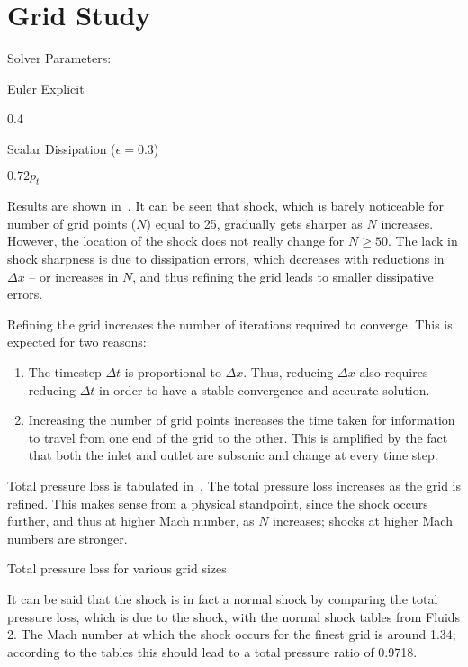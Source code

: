 \section{Grid Study}
Solver Parameters:
\begin{description}[noitemsep]
    \item[Timestepping Scheme:] Euler Explicit
    \item[CFL:] 0.4
    \item[Spatial Scheme:] Scalar Dissipation ($\epsilon = 0.3$)
    \item[\pexit:] $0.72 p_t$
\end{description}

Results are shown in~. It can be seen that shock, which is barely
noticeable for number of grid points ($N$) equal to 25, gradually gets sharper as $N$
increases. However, the location of the shock does not really change for $N \ge 50$.
The lack in shock sharpness is due to dissipation errors, which decreases with
reductions in $\Delta x$ -- or increases in $N$, and thus refining the grid
leads to smaller dissipative errors.

Refining the grid increases the number of iterations required to converge. This is
expected for two reasons:
\begin{enumerate}
    \item The timestep $\Delta t$ is proportional to $\Delta x$. Thus, reducing
        $\Delta x$ also requires reducing $\Delta t$ in order to have a stable
        convergence and accurate solution.
    \item Increasing the number of grid points increases the time taken for information
        to travel from one end of the grid to the other. This is amplified by the fact
        that both the inlet and outlet are subsonic and change at every time step.
\end{enumerate}

Total pressure loss is tabulated in~. The total pressure loss increases
as the grid is refined. This makes sense from a physical standpoint,
since the shock occurs further, and thus at higher Mach number, as $N$ increases;
shocks at higher Mach numbers are stronger.
\begin{table}[H]
    \centering
    \caption{Total pressure loss for various grid sizes}\label{tab:q3}
    
\end{table}
It can be said
that the shock is in fact a normal shock by comparing the
total pressure loss, which is due to the shock, with the normal shock tables from Fluids 2.
The Mach number at which the shock occurs for the finest grid is around 1.34; according
to the tables this should lead to a total pressure ratio of 0.9718.

